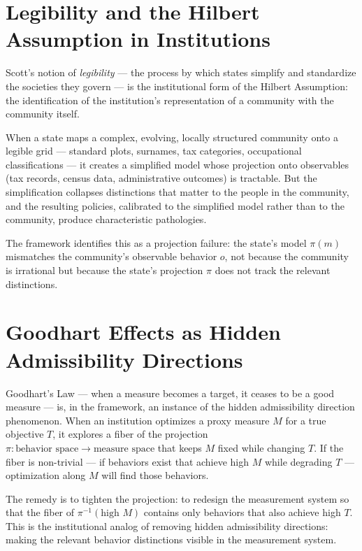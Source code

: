 \documentclass[12pt,a4paper]{book}
\theoremstyle{remark}
\theoremstyle{definition}
\begin{document}
\section{Legibility and the Hilbert Assumption in Institutions}

Scott's notion of \emph{legibility} --- the process by which states
simplify and standardize the societies they govern --- is the institutional
form of the Hilbert Assumption: the identification of the institution's
representation of a community with the community itself.

When a state maps a complex, evolving, locally structured community onto
a legible grid --- standard plots, surnames, tax categories, occupational
classifications --- it creates a simplified model whose projection
onto observables (tax records, census data, administrative outcomes) is
tractable. But the simplification collapses distinctions that matter to
the people in the community, and the resulting policies, calibrated to the
simplified model rather than to the community, produce characteristic
pathologies.

The framework identifies this as a projection failure: the state's model
$\pi(m)$ mismatches the community's observable behavior $o$, not because
the community is irrational but because the state's projection $\pi$ does
not track the relevant distinctions.

\section{Goodhart Effects as Hidden Admissibility Directions}

Goodhart's Law --- when a measure becomes a target, it ceases to be a
good measure --- is, in the framework, an instance of the hidden
admissibility direction phenomenon. When an institution optimizes a
proxy measure $M$ for a true objective $T$, it explores a fiber of
the projection $\pi : \text{behavior space} \to \text{measure space}$
that keeps $M$ fixed while changing $T$. If the fiber is non-trivial ---
if behaviors exist that achieve high $M$ while degrading $T$ ---
optimization along $M$ will find those behaviors.

The remedy is to tighten the projection: to redesign the measurement
system so that the fiber of $\pi^{-1}(\text{high } M)$ contains only
behaviors that also achieve high $T$. This is the institutional analog
of removing hidden admissibility directions: making the relevant behavior
distinctions visible in the measurement system.
\end{document}
